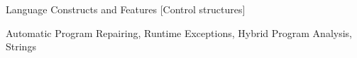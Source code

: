 \documentclass[pldi]{sigplanconf}
\begin{document}
\begin{abstract}


\end{abstract}

% 
{Language Constructs and Features}
[Control structures]

\keywords
Automatic Program Repairing, Runtime Exceptions,  Hybrid Program Analysis, Strings















\raggedright
\small


\end{document}
